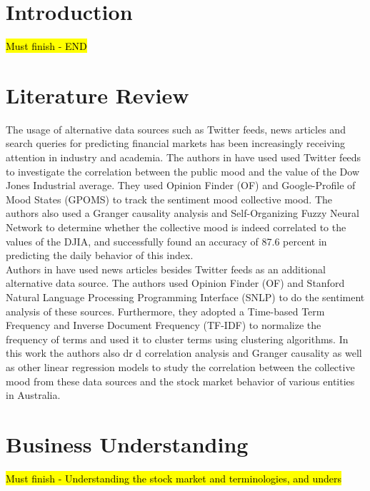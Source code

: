 \documentclass[sigconf, nonacm]{acmart}
\begin{document}
\section{Introduction}
\hl{Must finish - END}

\section{Literature Review}
The usage of alternative data sources such as Twitter feeds, news articles and search queries for predicting financial markets has been increasingly receiving attention in industry and academia. The authors in \cite{DBLP:journals/corr/abs-1010-3003} have used used Twitter feeds to investigate the correlation between the public mood and the value of the Dow Jones Industrial average. They used Opinion Finder (OF) and Google-Profile of Mood States (GPOMS) to track the sentiment mood collective mood. The authors also used a Granger causality analysis and Self-Organizing Fuzzy Neural Network to determine whether the collective mood is indeed correlated to the values of the DJIA, and successfully found an accuracy of 87.6 percent in predicting the daily behavior  of this index. \\
Authors in \cite{8713246} have used news articles besides Twitter feeds as an additional alternative data source. The authors used Opinion Finder (OF) and Stanford Natural Language Processing Programming Interface (SNLP) to do the sentiment analysis of these sources. Furthermore, they adopted a  Time-based Term Frequency and Inverse Document Frequency (TF-IDF) to  normalize the frequency of terms and used it to cluster terms using clustering algorithms. In this work the authors also dr
d correlation analysis and Granger causality as well as other linear regression models to study the correlation between the collective mood from these data sources and the stock market behavior of various entities in Australia. 

\section{Business Understanding}
\hl{Must finish - Understanding the stock market and terminologies, and unders}
\end{document}
